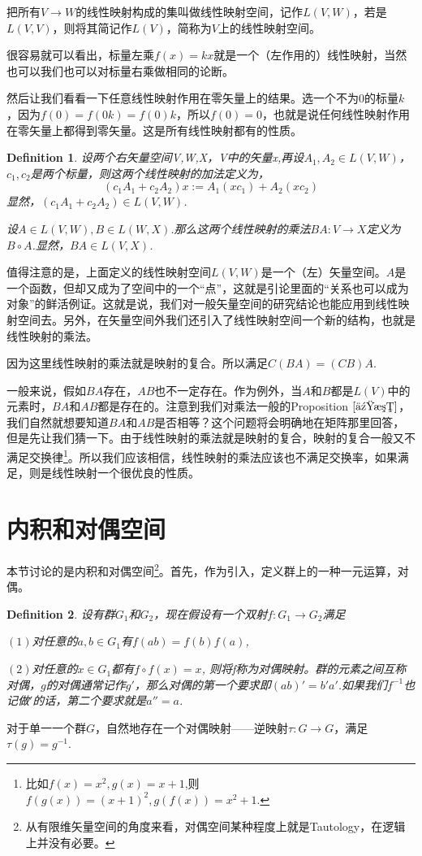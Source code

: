 \documentclass[11pt,a4paper,openany]{book}%
\theoremstyle{plain}%
\newtheorem{defi}{Definition}[chapter]%
\newcommand{\NO}[1]{{$(#1)$}}%
\newcommand{\pref}[1]{{\rm Proposition} $\ref{#1}$}
\begin{document}
\indent 把所有$V \rightarrow W$的线性映射构成的集叫做线性映射空间，记作$L(V,W)$，若是$L(V,V)$，则将其简记作$L(V)$，简称为$V$上的线性映射空间。

很容易就可以看出，标量左乘$f(x)=kx$就是一个（左作用的）线性映射，当然也可以我们也可以对标量右乘做相同的论断。

然后让我们看看一下任意线性映射作用在零矢量上的结果。选一个不为0的标量$k$，因为$f(0)=f(0k)=f(0)k$，所以$f(0)=0$，也就是说任何线性映射作用在零矢量上都得到零矢量。这是所有线性映射都有的性质。
\begin{defi}
设两个右矢量空间V,W,X，V中的矢量x,再设$A_{1},A_{2}\in L(V,W)$，$c_{1},c_{2}$是两个标量，则这两个线性映射的加法定义为，
\[
(c_1A_{1}+c_2A_{2})x:=A_{1}(xc_1)+A_{2}(xc_2)
\]
显然，$(c_{1}A_{1}+c_{2}A_{2})\in L(V,W)$.

设$A\in L(V,W),B\in L(W,X)$.那么这两个线性映射的乘法$BA:V\rightarrow X$定义为$B \circ A$.显然，$BA\in L(V,X)$.
\end{defi}
\indent 值得注意的是，上面定义的线性映射空间$L(V,W)$是一个（左）矢量空间。$A$是一个函数，但却又成为了空间中的一个“点”，这就是引论里面的“关系也可以成为对象”的鲜活例证。这就是说，我们对一般矢量空间的研究结论也能应用到线性映射空间去。另外，在矢量空间外我们还引入了线性映射空间一个新的结构，也就是线性映射的乘法。

因为这里线性映射的乘法就是映射的复合。所以满足$C(BA)=(CB)A$.

一般来说，假如$BA$存在，$AB$也不一定存在。作为例外，当$A$和$B$都是$L(V)$中的元素时，$BA$和$AB$都是存在的。注意到我们对乘法一般的\pref{乘法}，我们自然就想要知道$BA$和$AB$是否相等？这个问题将会明确地在矩阵那里回答，但是先让我们猜一下。由于线性映射的乘法就是映射的复合，映射的复合一般又不满足交换律\footnote{比如$f(x)=x^2,g(x)=x+1$,则$f(g(x))=(x+1)^2,g(f(x))=x^2+1$.}。所以我们应该相信，线性映射的乘法应该也不满足交换率，如果满足，则是线性映射一个很优良的性质。
\section{内积和对偶空间}
本节讨论的是内积和对偶空间\footnote{从有限维矢量空间的角度来看，对偶空间某种程度上就是Tautology，在逻辑上并没有必要。}。首先，作为引入，定义群上的一种一元运算，对偶。
\begin{defi}
\label{dual}
设有群$G_1$和$G_2$，现在假设有一个双射$f:G_1\rightarrow G_2$满足

\NO{1}对任意的$a,b\in G_1$有$f(ab)=f(b)f(a)$,

\NO{2}对任意的$x\in G_1$都有$f\circ f (x)=x$,
则将f称为对偶映射。群的元素之间互称对偶，$g$的对偶通常记作$g'$，那么对偶的第一个要求即$(ab)'=b'a'$.如果我们$f^{-1}$也记做$'$的话，第二个要求就是$a''=a$.
\end{defi}
对于单一一个群$G$，自然地存在一个对偶映射——逆映射$\tau:G\rightarrow G$，满足$\tau(g)=g^{-1}$.
\end{document}

